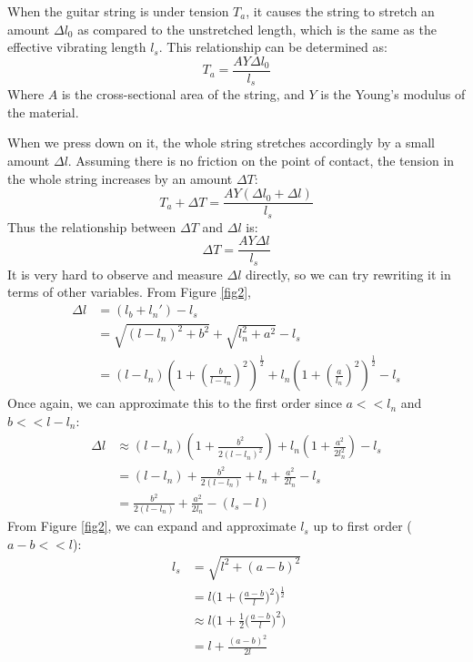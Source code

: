 When the guitar string is under tension $T_a$, it causes the string to stretch an amount $\Delta l_0$ as compared to the unstretched length, which is the same as the effective vibrating length $l_s$. This relationship can be determined as:
\begin{equation}
    T_a = \frac{AY\Delta l_0}{l_s}\label{eqn18}
\end{equation} 
Where $A$ is the cross-sectional area of the string, and $Y$ is the Young's modulus of the material. \cite{polak}

When we press down on it, the whole string stretches accordingly by a small amount $\Delta l$. Assuming there is no friction on the point of contact, the tension in the whole string increases by an amount $\Delta T$:
\begin{equation*}
    T_a + \Delta T = \frac{AY(\Delta l_0 + \Delta l)}{l_s}
\end{equation*}
Thus the relationship between $\Delta T$ and $\Delta l$ is:
\begin{equation}
    \Delta T = \frac{AY\Delta l}{l_s}\label{eqn19}
\end{equation} 
It is very hard to observe and measure $\Delta l$ directly, so we can try rewriting it in terms of other variables. From Figure \ref{fig2},  
\begin{align}
    \Delta l &= (l_b + l_n') - l_s \\
    &= \sqrt{(l-l_n)^2+b^2} + \sqrt{l_n^2+a^2} - l_s \\
    &= (l-l_n)\left(1+\left(\frac{b}{l-l_n}\right)^2\right)^{\frac{1}{2}} + l_n\left(1+\left(\frac{a}{l_n}\right)^2\right)^{\frac{1}{2}} - l_s
\end{align}
Once again, we can approximate this to the first order since $a << l_n$ and $b << l-l_n $:
\begin{align}
    \Delta l &\approx (l-l_n)\left(1+\frac{b^2}{2(l-l_n)^2}\right)+ l_n\left(1+\frac{a^2}{2l_n^2}\right) - l_s \label{eqn23} \\
    &= (l - l_n) + \frac{b^2}{2(l-l_n)} + l_n + \frac{a^2}{2l_n} - l_s \label{eqn24} \\
    &= \frac{b^2}{2(l-l_n)} + \frac{a^2}{2l_n} - (l_s - l) \label {eqn25}
\end{align}
From Figure \ref{fig2}, we can expand and approximate $l_s$ up to first order ($a-b << l$):
\begin{align}
    l_s &= \sqrt{l^2 + (a-b)^2}\\
    &= l\bigg(1 + \bigg(\frac{a-b}{l}\bigg)^2\bigg)^\frac{1}{2} \label{eqn27}\\
    &\approx l\bigg(1 + \frac{1}{2}\bigg(\frac{a-b}{l}\bigg)^2\bigg)\\
    &= l + \frac{(a-b)^2}{2l}
\end{align}
